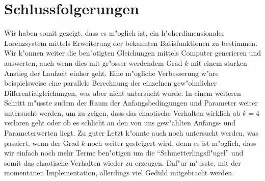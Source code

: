 \section{Schlussfolgerungen}
Wir haben somit gezeigt, dass es m"oglich ist, ein h"oherdimensionales 
Lorenzsystem mittels Erweiterung der bekannten Basisfunktionen zu bestimmen. 
Wir k"onnen weiter die ben"otigten Gleichungen mittels Computer generieren und 
auswerten, auch wenn dies mit gr"osser werdendem Grad $k$ mit einem starken 
Anstieg der Laufzeit einher geht. Eine m"ogliche Verbesserung w"are 
beispielsweise eine parallele Berechnung der einzelnen gew"ohnlicher 
Differentialgleichungen, was aber nicht untersucht wurde. In einem weiteren 
Schritt m"usste zudem der Raum der Anfangsbedingungen und Parameter weiter 
untersucht werden, um zu zeigen, dass das chaotische Verhalten wirklich ab $k = 
4$ verloren geht oder ob es schlicht an den von uns gew"ahlten Anfangs- und 
Parameterwerten liegt. Zu guter Letzt k"onnte auch noch untersucht werden, was 
passiert, wenn der Grad $k$ noch weiter gesteigert wird, denn es ist m"oglich, 
dass wir einfach noch mehr Terme ben"otigen um die ``Schmetterlingsfl"ugel'' 
und somit das chaotische Verhalten wieder zu erzeugen. Daf"ur m"usste, mit der 
momentanen Implementation, allerdings viel Geduld mitgebracht werden.

